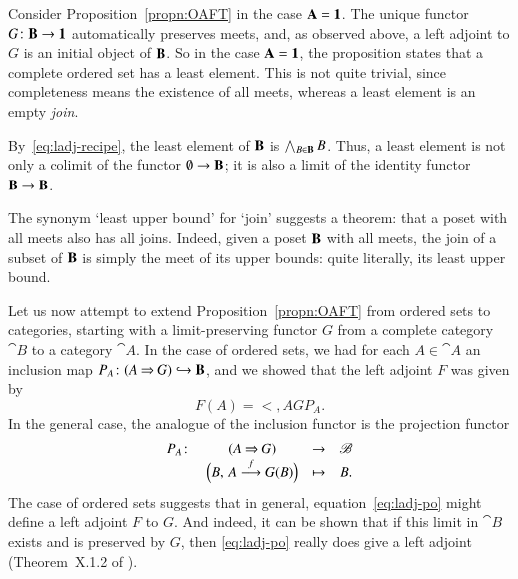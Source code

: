 \begin{example}
\label{eg:oaft-least}
%
%
Consider Proposition~\ref{propn:OAFT} in the case $\mathbf{A} = \mathbf{1}$.  The
unique functor $G\from \scat{B} \to \One$ automatically preserves meets,
and, as observed above, a left adjoint to $G$ is an initial object of
$\mathbf{B}$.  So in the case $\mathbf{A} = \mathbf{1}$, the proposition states that
a complete ordered set has a least element.  This is not quite trivial,
since completeness means the existence of all meets, whereas a least
element is an empty \emph{join}.

By~\eqref{eq:ladj-recipe}, the least%
%
%
element of $\mathbf{B}$ is $\bigwedge_{B \in \mathbf{B}} B$.  Thus, a least element
is not only a colimit of the functor $\emptyset \to \mathbf{B}$; it is also a
limit of the identity functor $\mathbf{B} \to \mathbf{B}$.

The synonym `least upper bound' for `join' suggests a theorem: that a poset
with all meets also has all joins.  Indeed, given a poset $\mathbf{B}$ with
all meets, the join of a subset of $\mathbf{B}$ is simply the meet of its
upper bounds: quite literally, its least upper bound.%
%
%
\end{example}

Let us now attempt to extend Proposition~\ref{propn:OAFT} from ordered sets
to categories, starting with a limit-preserving functor $G$ from a complete
category $\cat{B}$ to a category $\cat{A}$.  In the case of ordered sets,
we had for each $A \in \cat{A}$ an inclusion map $P_A \from \comma{A}{G}
\incl \scat{B}$, and we showed that the left adjoint $F$ was given by
%
\begin{equation}
\label{eq:ladj-po}
F(A) = \lt{\comma{A}{G}} P_A.
\end{equation}
%
In the general case, the analogue of the inclusion functor is the
projection functor
%
\begin{equation}
\label{eq:pjn-aft}
\begin{array}{cccc}
P_A\from    &\comma{A}{G}                       &\to            &\cat{B}\\
            &\Bigl(B,\, A \toby{f} G(B)\Bigr)   &\mapsto        &B.
\end{array}
\end{equation}
%
The case of ordered sets suggests that in general,
equation~\eqref{eq:ladj-po} might define a left adjoint $F$ to $G$.  And
indeed, it can be shown that if this limit in $\cat{B}$ exists and is
preserved by $G$, then \eqref{eq:ladj-po} really does give a left adjoint
(Theorem~X.1.2 of \citeCWM).

